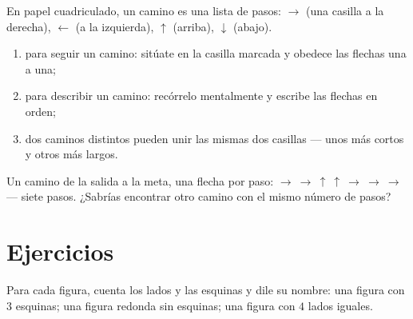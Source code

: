 \begin{method}\label{met:g1:shapes:path}
En papel cuadriculado, un camino es una lista de pasos:
$\to$ (una casilla a la derecha), $\leftarrow$ (a la izquierda), $\uparrow$ (arriba),
$\downarrow$ (abajo).
\begin{enumerate}
  \item para seguir un camino: sitúate en la casilla marcada y obedece
        las flechas una a una;
  \item para describir un camino: recórrelo mentalmente y escribe
        las flechas en orden;
  \item dos caminos distintos pueden unir las mismas dos casillas --- unos
        más cortos y otros más largos.
\end{enumerate}
\end{method}

\begin{omfigure}

{\small Un camino de la salida a la meta, una flecha por paso:
$\to\ \to\ \uparrow\ \uparrow\ \to\ \to\ \to$ --- siete pasos. ¿Sabrías
encontrar otro camino con el mismo número de pasos?}
\end{omfigure}

\section{Ejercicios}

\begin{exercise}[$\star$]\label{exo:g1:shapes:1}
Para cada figura, cuenta los lados y las esquinas y dile su nombre: una figura
con $3$ esquinas; una figura redonda sin esquinas; una figura con $4$
lados iguales.
\end{exercise}

